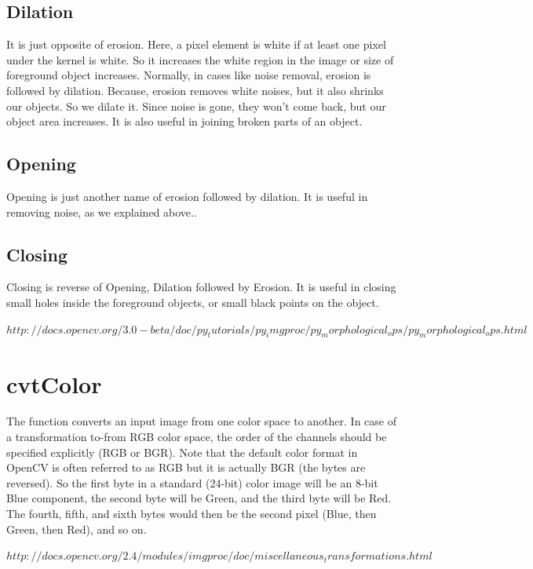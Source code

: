 \subsection{Dilation} \label{ssec:dilation}
It is just opposite of erosion. Here, a pixel element is white if at least one pixel under the kernel is white. So it increases the white region in the image or size of foreground object increases. Normally, in cases like noise removal, erosion is followed by dilation. Because, erosion removes white noises, but it also shrinks our objects. So we dilate it. Since noise is gone, they won’t come back, but our object area increases. It is also useful in joining broken parts of an object.
\subsection{Opening}
Opening is just another name of erosion followed by dilation. It is useful in removing noise, as we explained above..
\subsection{Closing}
Closing is reverse of Opening, Dilation followed by Erosion. It is useful in closing small holes inside the foreground objects, or small black points on the object.

\textit{$http://docs.opencv.org/3.0-beta/doc/py_tutorials/py_imgproc/py_morphological_ops/py_morphological_ops.html$}

\section{cvtColor}
The function converts an input image from one color space to another. In case of a transformation to-from RGB color space, the order of the channels should be specified explicitly (RGB or BGR). Note that the default color format in OpenCV is often referred to as RGB but it is actually BGR (the bytes are reversed). So the first byte in a standard (24-bit) color image will be an 8-bit Blue component, the second byte will be Green, and the third byte will be Red. The fourth, fifth, and sixth bytes would then be the second pixel (Blue, then Green, then Red), and so on.

\textit{$http://docs.opencv.org/2.4/modules/imgproc/doc/miscellaneous_transformations.html$}

